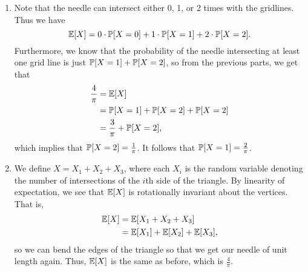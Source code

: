 \begin{enumerate}
\begin{enumerate}
        \item Note that the needle can intersect either 0, 1, or 2 times with the gridlines. Thus we have
        \[
            \E[X] = 0 \cdot \P[X = 0] + 1 \cdot \P[X = 1] + 2 \cdot \P[X = 2].
        \]
        Furthermore, we know that the probability of the needle intersecting at least one grid line is just $\P[X = 1] + \P[X = 2]$, so from the previous parts, we get that
        \begin{align*}
            \frac{4}{\pi} &= \E[X] \\
                &= \P[X = 1] + \P[X = 2] + \P[X = 2] \\
                &= \frac{3}{\pi} + \P[X = 2],
        \end{align*}
        which implies that $\P[X = 2] = \frac{1}{\pi}$. It follows that $\P[X = 1] = \frac{2}{\pi}$.
        
        \item We define $X = X_1 + X_2 + X_3$, where each $X_i$ is the random variable denoting the number of intersections of the $i$th side of the triangle. By linearity of expectation, we see that $\E[X]$ is rotationally invariant about the vertices. That is,
        \begin{align*}
            \E[X] &= \E[X_1 + X_2 + X_3] \\
                &= \E[X_1] + \E[X_2] + \E[X_3],
        \end{align*}
        so we can bend the edges of the triangle so that we get our needle of unit length again. Thus, $\E[X]$ is the same as before, which is $\frac{4}{\pi}$.
    \end{enumerate}
    

\end{enumerate}
